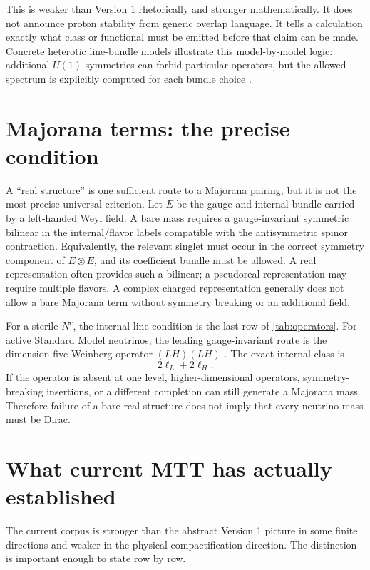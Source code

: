 \documentclass[11pt]{article}
\begin{document}
\begin{remark}
This is weaker than Version 1 rhetorically and stronger mathematically. It
does not announce proton stability from generic overlap language. It tells a
calculation exactly what class or functional must be emitted before that
claim can be made. Concrete heterotic line-bundle models illustrate this
model-by-model logic: additional \(U(1)\) symmetries can forbid particular
operators, but the allowed spectrum is explicitly computed for each bundle
choice \cite{Anderson2012}.
\end{remark}

\section{Majorana terms: the precise condition}

A ``real structure'' is one sufficient route to a Majorana pairing, but it
is not the most precise universal criterion. Let \(E\) be the gauge and
internal bundle carried by a left-handed Weyl field. A bare mass requires a
gauge-invariant symmetric bilinear in the internal/flavor labels compatible
with the antisymmetric spinor contraction. Equivalently, the relevant
singlet must occur in the correct symmetry component of \(E\otimes E\), and
its coefficient bundle must be allowed. A real representation often
provides such a bilinear; a pseudoreal representation may require multiple
flavors. A complex charged representation generally does not allow a bare
Majorana term without symmetry breaking or an additional field.

For a sterile \(N^c\), the internal line condition is the last row of
\cref{tab:operators}. For active Standard Model neutrinos, the leading
gauge-invariant route is the dimension-five Weinberg operator
\((LH)(LH)\) \cite{Weinberg1979}. The exact internal class is
\[
2\ell_L+2\ell_H.
\]
If the operator is absent at one level, higher-dimensional operators,
symmetry-breaking insertions, or a different completion can still generate
a Majorana mass. Therefore failure of a bare real structure does not imply
that every neutrino mass must be Dirac.

\section{What current MTT has actually established}

The current corpus is stronger than the abstract Version 1 picture in some
finite directions and weaker in the physical compactification direction.
The distinction is important enough to state row by row.
\end{document}

